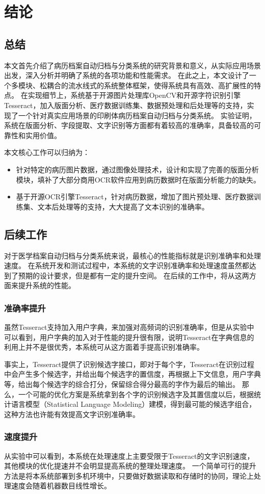 \chapter{结论}
\label{chap:conclusion}
\section*{总结}
本文首先介绍了病历档案自动归档与分类系统的研究背景和意义，从实际应用场景出发，深入分析并明确了系统的各项功能和性能需求。
在此之上，本文设计了一个多模块、松耦合的流水线式的系统整体框架，使得系统具有高效、高扩展性的特点。
在实现细节上，系统基于开源图片处理库OpenCV和开源字符识别引擎Tesseract，加入版面分析、医疗数据训练集、数据预处理和后处理等的支持，实现了一个针对真实应用场景的印刷体病历档案自动归档与分类系统。
实验证明，系统在版面分析、字段提取、文字识别等方面都有着较高的准确率，具备较高的可靠性和实用价值。

本文核心工作可以归纳为：
\begin{itemize}
  \item 针对特定的病历图片数据，通过图像处理技术，设计和实现了完善的版面分析模块，填补了大部分商用OCR软件应用到病历数据时在版面分析能力的缺失。
  \item 基于开源OCR引擎Tesseract，针对病历数据，增加了图片预处理、医疗数据训练集、文本后处理等的支持，大大提高了文本识别的准确率。
\end{itemize}

\section*{后续工作}
对于医学档案自动归档与分类系统来说，最核心的性能指标就是识别准确率和处理速度。
在系统开发和测试过程中，本系统的文字识别准确率和处理速度虽然都达到了预期的设计要求，但是都有一定的提升空间。
在后续的工作中，将从这两方面来提升系统的性能。
\subsection*{准确率提升}
虽然Tesseract支持加入用户字典，来加强对高频词的识别准确率，但是从实验中可以看到，用户字典的加入对于性能的提升很有限，说明Tesseract在字典信息的利用上并不是很优秀，本系统可从这方面着手提高识别准确率。

事实上，Tesseract提供了识别候选字接口，即对于每个字，Tesseract在识别过程中会产生多个候选字，并给出每个候选字的置信度，再根据上下文信息，用户字典等，给出每个候选字的综合打分，保留综合得分最高的字作为最后的输出。
那么，一个可能的优化方案是系统拿到各个字的识别候选字及其置信度以后，根据统计语言模型（Statistical Language Modeling）\citep{brown1990statistical}建模，得到最可能的候选字组合，这种方法也许能有效提高文字识别准确率。
\subsection*{速度提升}
从实验中可以看到，本系统在处理速度上主要受限于Tesseract的文字识别速度，其他模块的优化提速并不会明显提高系统的整理处理速度。
一个简单可行的提升方法是将本系统部署到多机环境中，只要做好数据读取和存储时的协同，理论上处理速度会随着机器数目线性增长。
